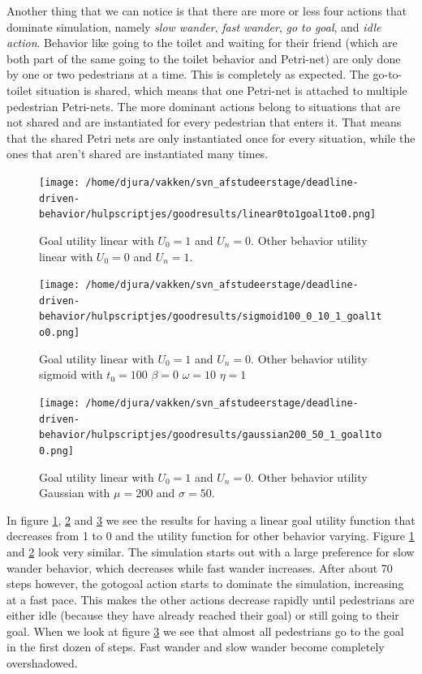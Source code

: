 \documentclass[11pt, a4paper]{book}
\begin{document}
Another thing that we can notice is that there are more or less four actions that dominate simulation, namely \emph{slow wander}, \emph{fast wander}, \emph{go to goal}, and \emph{idle action}.
 Behavior like going to the toilet and waiting for their friend (which are both part of the same going to the toilet behavior and Petri-net) are only done by one or two pedestrians at a time. This is completely as expected. The go-to-toilet situation is shared, which means that one Petri-net is attached to multiple pedestrian Petri-nets. The more dominant actions belong to situations that are not shared and are instantiated for every pedestrian that enters it. That means that the shared Petri nets are only instantiated once for every situation, while the ones that aren't shared are instantiated many times.

\begin{figure}[h!]
\centering            
\texttt{[image: /home/djura/vakken/svn\_afstudeerstage/deadline-driven-behavior/hulpscriptjes/goodresults/linear0to1goal1to0.png]}
\caption{Goal utility linear with $U_0=1$ and $U_n = 0$. Other behavior utility linear with  $U_0=0$ and $U_n=1$.}
\label{fig:linear0to1goal1to0}
\end{figure} 

\begin{figure}[h!]
\centering
\texttt{[image: /home/djura/vakken/svn\_afstudeerstage/deadline-driven-behavior/hulpscriptjes/goodresults/sigmoid100\_0\_10\_1\_goal1to0.png]}
\caption{Goal utility linear with $U_0=1$ and $U_n = 0$. Other behavior utility sigmoid with $t_0=100$ $\beta=0$ $\omega=10$ $\eta=1$}
\label{fig:sigmoid100_0_10_1_goal1to0}
\end{figure}

\begin{figure}[h!]
\centering
\texttt{[image: /home/djura/vakken/svn\_afstudeerstage/deadline-driven-behavior/hulpscriptjes/goodresults/gaussian200\_50\_1\_goal1to0.png]}
\caption{Goal utility linear with $U_0=1$ and $U_n = 0$. Other behavior utility Gaussian with $\mu=200$ and $\sigma=50$.}
\label{fig:Gaussian200_50_1_goal1to0}
\end{figure}

In figure \ref{fig:linear0to1goal1to0}, \ref{fig:sigmoid100_0_10_1_goal1to0} and \ref{fig:Gaussian200_50_1_goal1to0} we see the results for having a linear goal utility function that decreases from 1 to 0 and the utility function for other behavior varying. Figure \ref{fig:linear0to1goal1to0} and \ref{fig:sigmoid100_0_10_1_goal1to0} look very similar. The simulation starts out with a large preference for slow wander behavior, which decreases while fast wander increases. After about 70 steps however, the gotogoal action starts to dominate the simulation, increasing at a fast pace. This makes the other actions decrease rapidly until pedestrians are either idle (because they have already reached their goal) or still going to their goal. When we look at figure \ref{fig:Gaussian200_50_1_goal1to0} we see that almost all pedestrians go to the goal in the first dozen of steps. Fast wander and slow wander become completely overshadowed.
\end{document}
